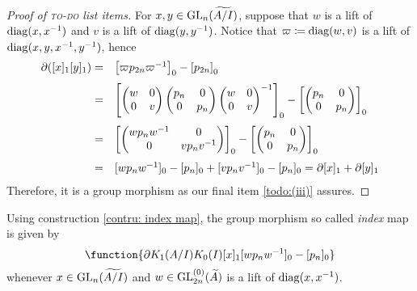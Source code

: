 \begin{proof}[Proof of \textsc{to-do} list items]
    For $x,y \in \operatorname{GL}_n(\widetilde{A/I})$, suppose that $w$ is a lift of $\operatorname{diag}(x,{x}^{-1})$ and $v$ is a lift of $\operatorname{diag}(y,{y}^{-1})$. Notice that $\varpi \coloneqq \operatorname{diag}(w,v)$ is a lift of $\operatorname{diag}(x,y, {x}^{-1},{y}^{-1})$, hence 
    \begin{equation*}
    \begin{array}{rl}
         \partial([x]_1[y]_1)= & \vspace{0.25cm}\left[ \varpi p_{2n}\inv\varpi\right]_0 - \left[p_{2n}\right]_0 
        \\= \vspace{0.25cm}& \left[ \begin{pmatrix}
            w & 0 \\ 0 & v
        \end{pmatrix} \begin{pmatrix}
            p_n & 0 \\ 0 & p_n
        \end{pmatrix}
        \inv{\begin{pmatrix}
            w & 0 \\ 0 & v
        \end{pmatrix}}
        \right]_0 - \left[ \begin{pmatrix}
            p_n & 0 \\ 0 & p_n
        \end{pmatrix}\right]_0
        \\= \vspace{0.25cm}&\left[\begin{pmatrix}
            wp_n\inv w & 0 \\ 0 & vp_n\inv v
        \end{pmatrix}\right]_0 - \left[\begin{pmatrix}
            p_n & 0 \\ 0 & p_n
        \end{pmatrix}\right]_0
        \\= & [wp_n\inv w]_0-[p_n]_0 + [vp_n\inv v]_0-[p_n]_0 = \partial [x]_1 + \partial[y]_1
    \end{array} 
    \end{equation*}
    Therefore, it is a group morphism as our final item \ref{todo:(iii)} assures. 
\end{proof}

\begin{definicao}
    Using construction \ref{contru: index map}, the group morphism so called \textit{index} map is given by
    \begin{equation*}
        \function{{\partial}{K_1(A/I)}{K_0(I)}{[x]_1}{[wp_n\inv w]_0 - [p_n]_0}}
    \end{equation*}
    whenever $x\in \operatorname{GL}_n(\widetilde{A/I})$ and $w \in \operatorname{GL}_{2n}^{(0)}(\widetilde{A})$ is a lift of $\operatorname{diag}(x,{x}^{-1})$.
\end{definicao}

